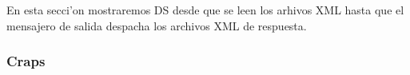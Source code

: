 En esta secci'on mostraremos DS desde que se leen los arhivos XML hasta que el mensajero de salida despacha los archivos XML de respuesta.

\subsubsection{Craps}


% 
% 
% 
% 
% 
% 
% 
% 
% 
% 
% 
% 
% 
% 
% 
% 
